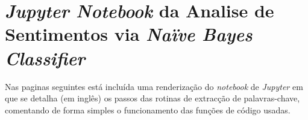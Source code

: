 \chapter{\textit{Jupyter Notebook} da Analise de Sentimentos via \textit{Naïve Bayes Classifier}}
\label{ap2}


Nas paginas seguintes está incluída uma renderização do \textit{notebook} de \textit{Jupyter} em que se detalha (em inglês) os passos das rotinas de extracção de palavras-chave, comentando de forma simples o funcionamento das funções de código usadas.

